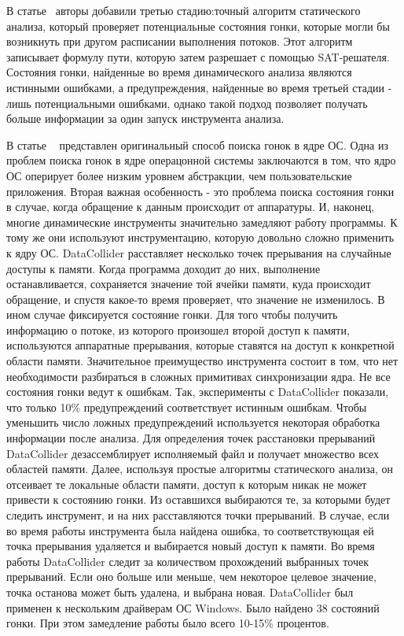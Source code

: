 В статье~\cite{Yoga:2016:PDR} авторы добавили третью стадию:точный алгоритм статического анализа, который проверяет потенциальные состояния гонки, которые могли бы возникнуть при другом расписании выполнения потоков.
Этот алгоритм записывает формулу пути, которую затем разрешает с помощью SAT-решателя.
Состояния гонки, найденные во время динамического анализа являются истинными ошибками, а предупреждения, найденные во время третьей стадии - лишь потенциальными ошибками, однако такой подход позволяет получать больше информации за один запуск инструмента анализа.

В статье ~\cite{DataCollider} представлен оригинальный способ поиска гонок в ядре ОС.
Одна из проблем поиска гонок в ядре операцонной системы заключаются в том, что ядро ОС оперирует более низким уровнем абстракции, чем пользовательские приложения.
Вторая важная особенность - это проблема поиска состояния гонки в случае, когда обращение к данным происходит от аппаратуры.
И, наконец, многие динамические инструменты значительно замедляют работу программы. К тому же они используют инструментацию, которую довольно сложно применить к ядру ОС. 
DataCollider расставляет несколько точек прерывания на случайные доступы к памяти.
Когда программа доходит до них, выполнение останавливается, сохраняется значение той ячейки памяти, куда происходит обращение, и спустя какое-то время проверяет, что значение не изменилось.
В ином случае фиксируется состояние гонки. Для того чтобы получить информацию о потоке, из которого произошел второй доступ к памяти, используются аппаратные прерывания, которые ставятся на доступ к конкретной области памяти.
Значительное преимущество инструмента состоит в том, что нет необходимости разбираться в сложных примитивах синхронизации ядра.
Не все состояния гонки ведут к ошибкам. Так, эксперименты с DataCollider показали, что только 10\% предупреждений соответствует истинным ошибкам. Чтобы уменьшить число ложных предупреждений используется некоторая обработка информации после анализа.
Для определения точек расстановки прерываний DataCollider дезассемблирует исполняемый файл и получает множество всех областей памяти.
Далее, используя простые алгоритмы статического анализа, он отсеивает те локальные области памяти, доступ к которым никак не может привести к состоянию гонки.
Из оставшихся выбираются те, за которыми будет следить инструмент, и на них расставляются точки прерываний.
В случае, если во время работы инструмента была найдена ошибка, то соответствующая ей точка прерывания удаляется и выбирается новый доступ к памяти.
Во время работы DataCollider следит за количеством прохождений выбранных точек прерываний.
Если оно больше или меньше, чем некоторое целевое значение, точка останова может быть удалена, и выбрана новая.
DataCollider был применен к нескольким драйверам ОС Windows. Было найдено 38 состояний гонки. При этом замедление работы было всего 10-15\% процентов. 

